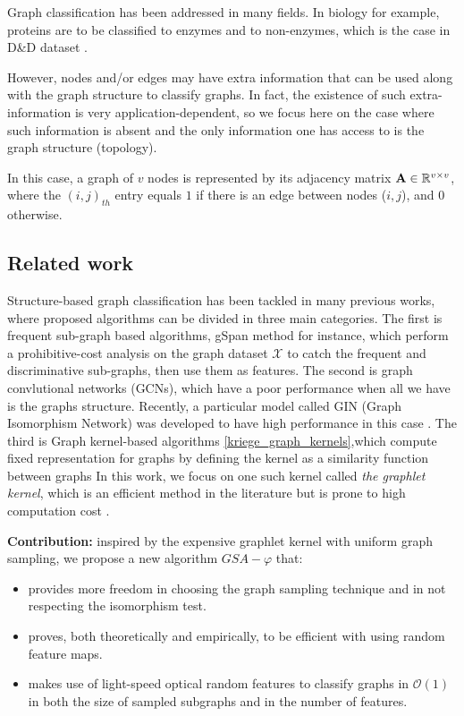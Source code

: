 \documentclass{article}
\begin{document}
Graph classification has been addressed in many fields. In biology for example,  proteins are to be classified to enzymes and to non-enzymes, which is the case in D\&D dataset \cite{protein_application}.

However, nodes and/or edges may have extra information that can be used along with the graph structure to classify graphs. In fact, the existence of such extra-information is very application-dependent, so we focus here on the case where such information is absent and the only information one has access to is the graph structure (topology).  

In this case, a graph of $v$ nodes is represented by its adjacency matrix $\mathbf{A}\in\mathbb{R}^{v\times v}$, where the $(i,j)_{th}$ entry equals $1$ if there is an edge between nodes ($i, j$), and $0$ otherwise. 

\subsection{Related work}\label{sec:related_work}
Structure-based graph classification has been tackled in many previous works, where proposed algorithms can be divided in three main categories. The first is frequent sub-graph based algorithms, gSpan method \cite{frequent_subgraphs} for instance, which perform a prohibitive-cost analysis on the graph dataset $\mathcal{X}$ to catch the frequent and discriminative sub-graphs, then use them as features. The second is graph convlutional networks (GCNs), which have a poor performance when all we have is the graphs structure. Recently, a particular model called GIN (Graph Isomorphism Network) was developed to have high performance in this case \cite{GCN_powerful}. The third is Graph kernel-based algorithms \ref{kriege_graph_kernels},which compute fixed representation for graphs by defining the kernel as a similarity function between graphs In this work, we focus on one such kernel called \emph{the graphlet kernel}, which is an efficient method in the literature but is prone to high computation cost \cite{graphlet_kernel}.

\noindent\textbf{Contribution:} inspired by the expensive graphlet kernel with uniform graph sampling, we propose a new algorithm $GSA-\varphi$ that:
\begin{itemize}
    \item provides more freedom in choosing the graph sampling technique and in not respecting the isomorphism test.
    \item proves, both theoretically and empirically, to be efficient with using random feature maps.
    \item makes use of light-speed optical random features to classify graphs in $\mathcal{O}(1)$ in both the size of sampled subgraphs and in the number of features.
\end{itemize}
\end{document}
